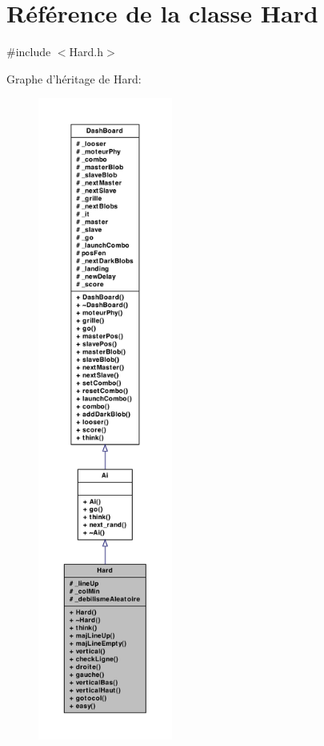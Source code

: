 \hypertarget{a00010}{
\section{Référence de la classe Hard}
\label{a00010}
}


{\ttfamily \#include $<$Hard.h$>$}



Graphe d'héritage de Hard:
\nopagebreak
\begin{figure}[H]
\begin{center}
\leavevmode
\includegraphics[height=600pt]{a00086}
\end{center}
\end{figure}


